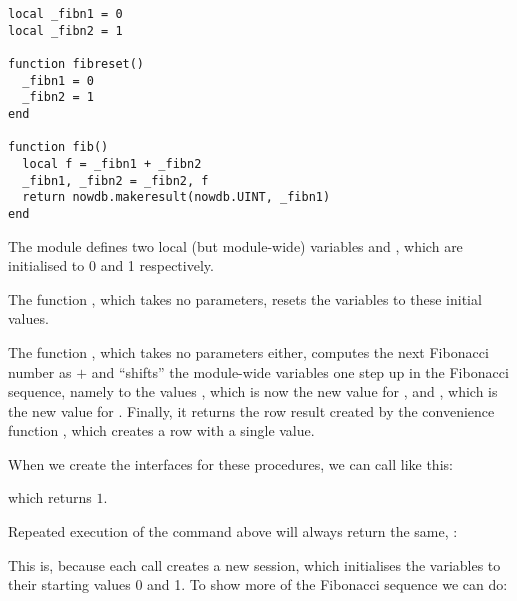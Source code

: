 \begin{lua}
\begin{lstlisting}
local _fibn1 = 0
local _fibn2 = 1

function fibreset()
  _fibn1 = 0
  _fibn2 = 1
end

function fib()
  local f = _fibn1 + _fibn2
  _fibn1, _fibn2 = _fibn2, f
  return nowdb.makeresult(nowdb.UINT, _fibn1)
end
\end{lstlisting}
\end{lua}

The module defines two local (but module-wide)
variables  and ,
which are initialised to 0 and 1 respectively.

The function , which takes no
parameters, resets the variables to these
initial values.

The function , which takes no parameters either,
computes the next Fibonacci number as
 $+$  and
``shifts'' the module-wide variables one step
up in the Fibonacci sequence, namely to
the values , which is now
the new value for , and ,
which is the new value for .
Finally, it returns the row result created by
the convenience function ,
which creates a row with a single value.

When we create the interfaces for these procedures,
we can call  like this:


which returns $1$.

Repeated execution of the command above will always return the same, \eg:


This is, because each call creates a new session, which
initialises the variables to their starting values 0 and 1.
To show more of the Fibonacci sequence we can do:


